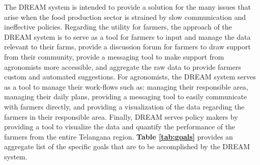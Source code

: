 The DREAM system is intended to provide a solution for the many issues that arise when the food production sector is strained by slow communication and ineffective policies. Regarding the utility for farmers, the approach of the DREAM system is to serve as a tool for farmers to input and manage the data relevant to their farms, provide a discussion forum for farmers to draw support from their community, provide a messaging tool to make support from agronomists more accessible, and aggregate the raw data to provide farmers custom and automated suggestions. For agronomists, the DREAM system serves as a tool to manage their work-flows such as: managing their responsible area, managing their daily plans, providing a messaging tool to easily communicate with farmers directly, and providing a visualization of the data regarding the farmers in their responsible area.
Finally, DREAM serves policy makers by providing a tool to visualize the data and quantify the performance of the farmers from the entire Telangana region. \textbf{Table \ref{tab:goals}} provides an aggregate list of the specific goals that are to be accomplished by the DREAM system.

